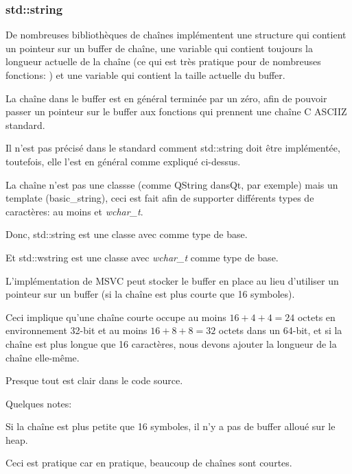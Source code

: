 \subsubsection{std::string}
\label{std_string}


De nombreuses bibliothèques de chaînes  implémentent une
structure qui contient un pointeur sur un buffer de chaîne, une variable qui contient
toujours la longueur actuelle de la chaîne (ce qui est très pratique pour de nombreuses
fonctions: ) et une variable qui contient la taille actuelle
du buffer.

La chaîne  dans le buffer est en général terminée par un zéro, afin de pouvoir passer
un pointeur sur le buffer aux fonctions qui prennent une chaîne C \ac{ASCIIZ} standard.

Il n'est pas précisé dans le standard \Cpp comment std::string doit être implémentée,
toutefois, elle l'est en général comme expliqué ci-dessus.

La chaîne \Cpp n'est pas une classse (comme QString dansQt, par exemple) mais un
template (basic\_string), ceci est fait afin de supporter différents types de caractères:
au moins \Tchar et \emph{wchar\_t}.

Donc, std::string est une classe avec \Tchar comme type de base.

Et std::wstring est une classe avec \emph{wchar\_t} comme type de base.


L'implémentation de MSVC peut stocker le buffer en place au lieu d'utiliser un pointeur
sur un buffer (si la chaîne est plus courte que 16 symboles).


Ceci implique qu'une chaîne courte occupe au moins $16 + 4 + 4 = 24$
octets en environnement 32-bit et au moins $16 + 8 + 8 = 32$
octets dans un 64-bit, et si la chaîne est plus longue que 16 caractères, nous devons
ajouter la longueur de la chaîne elle-même.



Presque tout est clair dans le code source.

Quelques notes:

Si la chaîne est plus petite que 16 symboles, il n'y a pas de buffer alloué sur le
\gls{heap}.

Ceci est pratique car en pratique, beaucoup de chaînes sont courtes.

